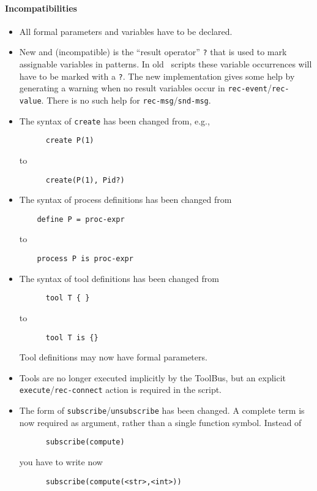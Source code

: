 \documentclass[a4,twoside,noweb]{article} %
\begin{document}
\paragraph{Incompatibilities}
\begin{itemize}

\item All formal parameters and variables have to be declared.

\item New and (incompatible) is the ``result operator'' {\tt ?} that is used
  to mark assignable variables in patterns. In old \T\ scripts these
  variable occurrences will have to be marked with a {\tt ?}.
  The new implementation gives some help by generating
  a warning when no result variables occur in {\tt rec-event}/{\tt rec-value}.
  There is no such help for {\tt rec-msg}/{\tt snd-msg}.

\item The syntax of {\tt create} has been changed from, e.g.,
\begin{verbatim}
      create P(1)
\end{verbatim}
to
\begin{verbatim}
      create(P(1), Pid?)
\end{verbatim}

\item The syntax of process definitions has been changed from
\begin{verbatim}
	define P = proc-expr
\end{verbatim}
  to
\begin{verbatim}
	process P is proc-expr
\end{verbatim}

\item  The syntax of tool definitions has been changed from
\begin{verbatim}
      tool T { }
\end{verbatim}
  to
\begin{verbatim}
      tool T is {}
\end{verbatim}
Tool definitions may now have formal parameters.

\item Tools are no longer executed implicitly by the ToolBus, but an
  explicit {\tt execute}/{\tt rec-connect} action is required in the script.

\item The form of {\tt subscribe}/{\tt unsubscribe} has been changed. A complete
  term is now required as argument, rather than a single function
  symbol. Instead of
\begin{verbatim}
      subscribe(compute)
\end{verbatim}
  you have to write now
\begin{verbatim}
      subscribe(compute(<str>,<int>))
\end{verbatim}

\end{itemize}
\end{document}
